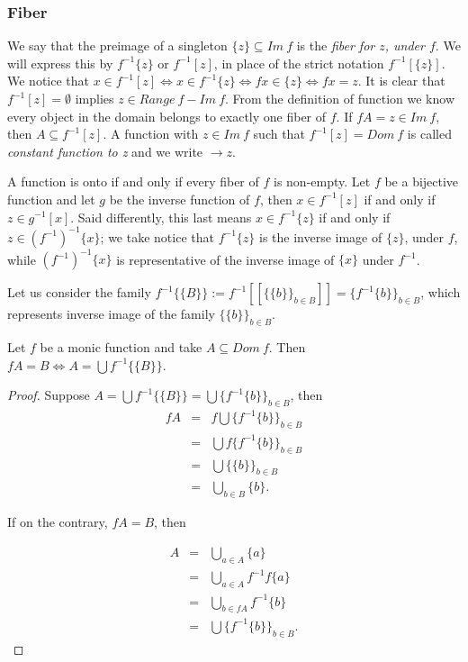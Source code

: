 \documentclass [12pt]{book}
\begin{document}
		\subsubsection{Fiber}

We say that the preimage of a singleton $\{z\}\subseteq Im~f$ is the \textit{fiber for $z$, under $f$}. We will express this by $f^{-1}\{z\}$ or $f^{-1}[z]$, in place of the strict notation $f^{-1}[\{z\}]$. We notice that $x\in f^{-1}[z]\Leftrightarrow x\in f^{-1}\{z\}\Leftrightarrow fx\in\{z\}\Leftrightarrow fx=z$. It is clear that $f^{-1}[z]=\emptyset$ implies $z\in Range~f-Im~f$. From the definition of function we know every object in the domain belongs to exactly one fiber of $f$. If $fA=z\in Im~f$, then $A\subseteq f^{-1}[z]$. A function with $z\in Im~f$ such that $f^{-1}[z]=Dom~f$ is called \textit{constant function to z} and we write $\rightarrow z$.

A function is onto if and only if every fiber of $f$ is non-empty. Let $f$ be a bijective function and let $g$ be the inverse function of $f$, then $x\in f^{-1}[z]$ if and only if $z\in g^{-1}[x]$. Said differently, this last means $x\in f^{-1}\{z\}$ if and only if $z\in(f^{-1})^{-1}\{x\}$; we take notice that $f^{-1}\{z\}$ is the inverse image of $\{z\}$, under $f$, while $(f^{-1})^{-1}\{x\}$ is representative of the inverse image of $\{x\}$ under $f^{-1}$.

Let us consider the family $f^{-1}\{\{B\}\}:=f^{-1}[[\{\{b\}\}_{b\in B}]]=\{f^{-1}\{b\}\}_{b\in B}$, which represents inverse image of the family $\{\{b\}\}_{b\in B}$.

\begin{proposition}Let $f$ be a monic function and take $A\subseteq Dom~f$. Then   $fA=B\Leftrightarrow A=\bigcup f^{-1}\{\{B\}\}$.\label{FIB}\end{proposition}

\begin{proof}Suppose $A=\bigcup f^{-1}\{\{B\}\}=\bigcup\{f^{-1}\{b\}\}_{b\in B}$, then \begin{eqnarray}\nonumber fA&=&f\bigcup\{f^{-1}\{b\}\}_{b\in B}\\\nonumber&=&\bigcup f\{f^{-1}\{b\}\}_{b\in B}\\\nonumber&=&\bigcup\{\{b\}\}_{b\in B}\\\nonumber&=&\bigcup_{b\in B}\{b\}.\end{eqnarray}

If on the contrary, $fA=B$, then

\begin{eqnarray}\nonumber A&=&\bigcup_{a\in A}\{a\}\\\nonumber&=&\bigcup_{a\in A}f^{-1}f\{a\}\\\nonumber&=&\bigcup_{b\in fA}f^{-1}\{b\}\\\nonumber&=&\bigcup\{f^{-1}\{b\}\}_{b\in B}.\end{eqnarray}

\end{proof}
\end{document}

